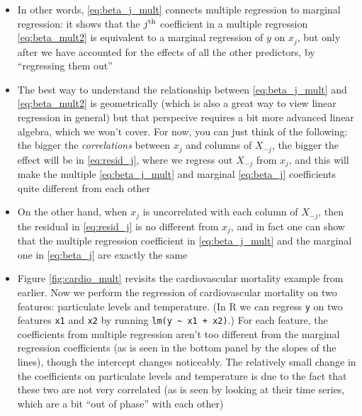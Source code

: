\documentclass{article}
\begin{document}
\begin{itemize}
\item In other words, \eqref{eq:beta_j_mult} connects multiple regression to
  marginal regression: it shows that the $j^{\textnormal{th}}$ coefficient in a multiple
  regression \eqref{eq:beta_mult2} is equivalent to a marginal regression of $y$
  on $x_j$, but only after we have accounted for the effects of all the other
  predictors, by ``regressing them out'' 

\item The best way to understand the relationship between \eqref{eq:beta_j_mult}
  and \eqref{eq:beta_mult2} is geometrically (which is also a great way to view 
  linear regression in general) but that perspecive requires a bit more advanced
  linear algebra, which we won't cover. For now, you can just think of the
  following: the bigger the \emph{correlations} between $x_j$ and columns of
  $X_{-j}$, the bigger the effect will be in \eqref{eq:resid_j}, where we
  regress out $X_{-j}$ from $x_j$, and this will make the multiple
  \eqref{eq:beta_j_mult} and marginal \eqref{eq:beta_j} coefficients quite 
  different from each other

\item On the other hand, when $x_j$ is uncorrelated with each column of
  $X_{-j}$, then the residual  in \eqref{eq:resid_j} is
  no different from $x_j$, and in fact one can show that the multiple regression
  coefficient in \eqref{eq:beta_j_mult} and the marginal one in
  \eqref{eq:beta_j} are exactly the same

\item Figure \ref{fig:cardio_mult} revisits the cardiovascular mortality example
  from earlier. Now we perform the regression of cardiovascular mortality on two
  features: particulate levels and temperature. (In R we can regress \verb|y| on
  two features \verb|x1| and \verb|x2| by running \verb|lm(y ~ x1 + x2)|.) For
  each feature, the coefficients from multiple regression aren't too different
  from the marginal regression coefficients (as is seen in the bottom panel by
  the slopes of the lines), though the intercept changes noticeably. The 
  relatively small change in the coefficients on particulate levels and
  temperature is due to the fact that these two are not very correlated (as is
  seen by looking at their time series, which are a bit ``out of phase'' with
  each other) 


\end{itemize}
\end{document}
